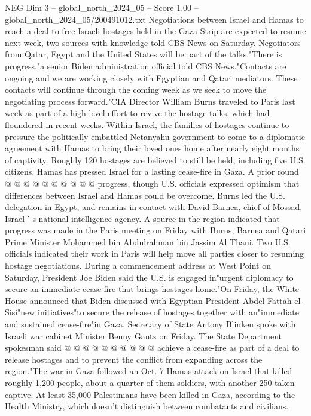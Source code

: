 \begin{textsample}{NEG Dim 3 – global\_north\_2024\_05 – Score 1.00 – global\_north\_2024\_05/200491012.txt}  \label{ex:f3_neg_448}
Negotiations between Israel and Hamas to reach a deal to free Israeli hostages held in the Gaza Strip are expected to resume next week, two sources with knowledge told CBS News on Saturday.
Negotiators from Qatar, Egypt and the United States will be part of the talks."There is progress,"a senior Biden administration official told CBS News."Contacts are ongoing and we are working closely with Egyptian and Qatari mediators.
These contacts will continue through the coming week as we seek to move the negotiating process forward."CIA Director William Burns traveled to Paris last week as part of a high-level effort to revive the hostage talks, which had floundered in recent weeks.
Within Israel, the families of hostages continue to pressure the politically embattled Netanyahu government to come to a diplomatic agreement with Hamas to bring their loved ones home after nearly eight months of captivity.
Roughly 120 hostages are believed to still be held, including five U.S. citizens.
Hamas has pressed Israel for a lasting cease-fire in Gaza.
A prior round @ @ @ @ @ @ @ @ @ @ progress, though U.S. officials expressed optimism that differences between Israel and Hamas could be overcome.
Burns led the U.S. delegation in Egypt, and remains in contact with David Barnea, chief of Mossad, Israel ' s national intelligence agency.
A source in the region indicated that progress was made in the Paris meeting on Friday with Burns, Barnea and Qatari Prime Minister Mohammed bin Abdulrahman bin Jassim Al Thani.
Two U.S. officials indicated their work in Paris will help move all parties closer to resuming hostage negotiations.
During a commencement address at West Point on Saturday, President Joe Biden said the U.S. is engaged in"urgent diplomacy to secure an immediate cease-fire that brings hostages home."On Friday, the White House announced that Biden discussed with Egyptian President Abdel Fattah el-Sisi"new initiatives"to secure the release of hostages together with an"immediate and sustained cease-fire"in Gaza.
Secretary of State Antony Blinken spoke with Israeli war cabinet Minister Benny Gantz on Friday.
The State Department spokesman said @ @ @ @ @ @ @ @ @ @ achieve a cease-fire as part of a deal to release hostages and to prevent the conflict from expanding across the region."The war in Gaza followed an Oct. 7 Hamas attack on Israel that killed roughly 1,200 people, about a quarter of them soldiers, with another 250 taken captive.
At least 35,000 Palestinians have been killed in Gaza, according to the Health Ministry, which doesn't distinguish between combatants and civilians.

\end{textsample}
